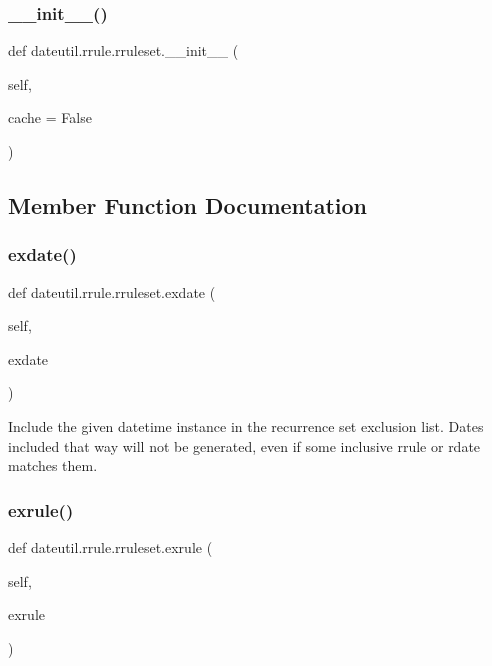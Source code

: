 \subsubsection{\texorpdfstring{\+\_\+\+\_\+init\+\_\+\+\_\+()}{\_\_init\_\_()}}
{\footnotesize\ttfamily def dateutil.\+rrule.\+rruleset.\+\_\+\+\_\+init\+\_\+\+\_\+ (\begin{DoxyParamCaption}\item[{}]{self,  }\item[{}]{cache = {\ttfamily False} }\end{DoxyParamCaption})}



\subsection{Member Function Documentation}
\mbox{\label{classdateutil_1_1rrule_1_1rruleset_a434ff66add95e9a8f4c7480b574b3601}} 
\subsubsection{\texorpdfstring{exdate()}{exdate()}}
{\footnotesize\ttfamily def dateutil.\+rrule.\+rruleset.\+exdate (\begin{DoxyParamCaption}\item[{}]{self,  }\item[{}]{exdate }\end{DoxyParamCaption})}

\begin{DoxyVerb}Include the given datetime instance in the recurrence set
    exclusion list. Dates included that way will not be generated,
    even if some inclusive rrule or rdate matches them. \end{DoxyVerb}
 \mbox{\label{classdateutil_1_1rrule_1_1rruleset_abba38d9fb938ddaa7814df05e110ca9c}} 
\subsubsection{\texorpdfstring{exrule()}{exrule()}}
{\footnotesize\ttfamily def dateutil.\+rrule.\+rruleset.\+exrule (\begin{DoxyParamCaption}\item[{}]{self,  }\item[{}]{exrule }\end{DoxyParamCaption})}

